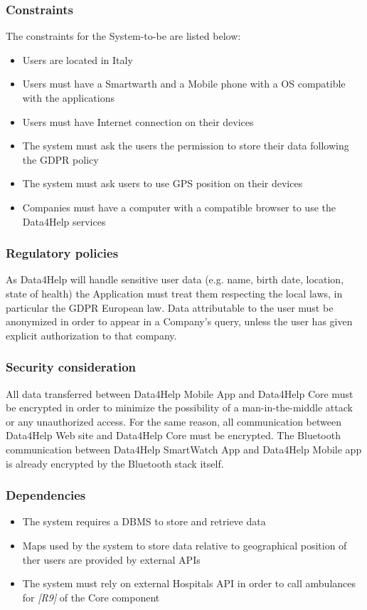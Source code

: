 \subsubsection{Constraints}
The constraints for the System-to-be are listed below:
\begin{itemize}
    \item Users are located in Italy
    \item Users must have a Smartwarth and a Mobile phone with a OS compatible with the applications
    \item Users must have Internet connection on their devices
    \item The system must ask the users the permission to store their data following the GDPR policy
    \item The system must ask users to use GPS position on their devices
    \item Companies must have a computer with a compatible browser to use the Data4Help services
\end{itemize}

\subsubsection{Regulatory policies}
As Data4Help will handle sensitive user data (e.g. name, birth date, location, state of health) the Application must treat them respecting the local laws, in particular the GDPR European law. Data attributable to the user must be anonymized in order to appear in a Company's query, unless the user has given explicit authorization to that company.

\subsubsection{Security consideration}
All data transferred between Data4Help Mobile App and Data4Help Core must be encrypted in order to minimize the possibility of a man-in-the-middle attack or any unauthorized access.
For the same reason, all communication between Data4Help Web site and Data4Help Core must be encrypted.
The Bluetooth communication between Data4Help SmartWatch App and Data4Help Mobile app is already encrypted by the Bluetooth stack itself.

\subsubsection{Dependencies}
\begin{itemize}
    \item The system requires a DBMS to store and retrieve data
    \item Maps used by the system to store data relative to geographical position of ther users are provided by external APIs
    \item The system must rely on external Hospitals API in order to call ambulances for \textit{[R9]} of the Core component
\end{itemize}
